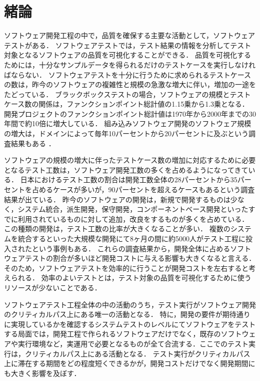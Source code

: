 \chapter{緒論}
ソフトウェア開発工程の中で，品質を確保する主要な活動として，ソフトウェアテストがある．
ソフトウェアテストでは，テスト結果の情報を分析してテスト対象となるソフトウェアの品質を可視化することができる．
品質を可視化するためには，十分なサンプルデータを得られるだけのテストケースを実行しなければならない．
ソフトウェアテストを十分に行うために求められるテストケースの数は，昨今のソフトウェアの複雑性と規模の急激な増大に伴い，増加の一途をたどっている．
ブラックボックステストの場合，ソフトウェアの規模とテストケース数の関係は，ファンクションポイント総計値の1.15乗から1.3乗となる\cite{jones1998estimating}．
開発プロジェクトのファンクションポイント総計値は1970年から2000年までの30年間で約10倍に増大している\cite{longstreet2000}．
組み込みソフトウェア開発のソフトウェア規模の増大は，ドメインによって毎年10パーセントから20パーセントに及ぶという調査結果もある \cite{jones2009}．

ソフトウェアの規模の増大に伴ったテストケース数の増加に対応するために必要となるテスト工数は，ソフトウェア開発工数の多くを占めるようになってきている．
日本におけるテスト工数の割合は開発工数全体の28パーセントから35パーセントを占めるケースが多いが，90パーセントを超えるケースもあるという調査結果が出ている\cite{IPA2015}．
昨今のソフトウェアの開発は，新規で開発するものは少なく，システム統合，派生開発\cite{simizu2005}\cite{simizu2009}，保守開発，コンポーネントベース開発\cite{gao2003testing}といったすでに利用されているものに対して追加，改良をするものが多くを占めている．
この種類の開発は，テスト工数の比率が大きくなることが多い．
複数のシステムを統合するといった大規模な開発にて8ヶ月の間に約5000人がテスト工程に投入されたという事例もある\cite{MTBUDay2}．
これらの調査結果から，開発全体に占めるソフトウェアテストの割合が多いほど開発コストに与える影響も大きくなると言える．
そのため，ソフトウェアテストを効率的に行うことが開発コストを左右すると考えられる．
効率のよいテストとは，テスト対象の品質を可視化するために使うリソースが少ないことである．

ソフトウェアテスト工程全体の中の活動のうち，テスト実行がソフトウェア開発のクリティカルパス上にある唯一の活動となる．
特に，開発の要件が期待通りに実現しているかを確認するシステムテストのレベルにてソフトウェアをテストする局面では，開発工程で作られるソフトウェアだけでなく，既存のソフトウェアや実行環境など，実運用で必要となるものが全て合流する．ここでのテスト実行は，クリティカルパス上にある活動となる．
テスト実行がクリティカルパス上に滞在する期間をどの程度短くできるかが，開発コストだけでなく開発期間にも大きく影響を及ぼす．

